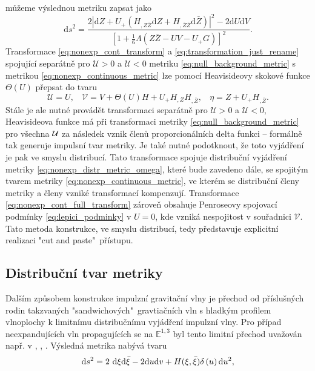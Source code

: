 můžeme výslednou metriku zapsat jako
\begin{equation}
    \label{eq:nonexp_continuous_metric}
    \mathrm{d} s^{2}=\frac{2\left|\mathrm{d} Z+U_+\left(H_{, Z \bar{Z}} 
    \mathrm{d} Z+H_{, \bar{Z} \bar{Z}} \mathrm{d} \bar{Z}\right)\right|^{2}-2 \mathrm{d} U 
    \mathrm{d} V}{\left[1+\frac{1}{6} \Lambda(Z \bar{Z}-U V-U_+ G)\right]^{2}}.
\end{equation}
Transformace \eqref{eq:nonexp_cont_transform} a \eqref{eq:transformation_just_rename} spojující separátně pro $\mathcal{U}>0$ a $\mathcal{U}<0$ metriku \eqref{eq:null_background_metric}
s metrikou \eqref{eq:nonexp_continuous_metric} lze pomocí Heavisideovy skokové funkce $\Theta(U)$ přepsat do tvaru 
\begin{equation}
    \label{eq:nonexp_cont_full_transform}
    \mathcal{U}=U,~~~~ \mathcal{V}=V+\Theta(U) H + U_+ H_{,Z}H_{,\bar{Z}},~~~~ \eta=Z+ U_+ H_{,\bar{Z}}.
\end{equation}
Stále je ale nutné provádět transformaci separátně pro $\mathcal{U}>0$ a $\mathcal{U}<0$, Heavisideova funkce
má při transformaci metriky \eqref{eq:null_background_metric} pro všechna $\mathcal{U}$ za následek vznik členů proporcionálních delta funkci -- formálně tak generuje impulsní tvar metriky. Je také nutné podotknout,
že toto vyjádření je pak ve smyslu distribucí.
Tato transformace spojuje distribuční vyjádření metriky \eqref{eq:nonexp_distr_metric_omega}, které bude zavedeno dále,
se spojitým tvarem metriky \eqref{eq:nonexp_continuous_metric}, ve kterém se distribuční členy metriky a členy vzniké transformací kompenzují.
Transformace \eqref{eq:nonexp_cont_full_transform} zároveň obsahuje Penroseovy spojovací podmínky \eqref{eq:lepici_podminky} v $U=0$, kde
vzniká nespojitost v souřadnici $\mathcal{V}$. Tato metoda konstrukce, ve smyslu distribucí, tedy představuje explicitní realizaci "cut and paste"\ přístupu.


\subsection{Distribuční tvar metriky}
Dalším způsobem konstrukce impulzní gravitační vlny je přechod od příslušných rodin takzvaných "sandwichových"\
gravtiačních vln s hladkým profilem vlnoplochy k limitnímu distribučnímu vyjádření impulzní vlny. Pro případ neexpandujících vln propagujících se
na $\mathbb{E}^{1,3}$ byl tento limitní přechod uvažován např. v \cite{Penrose1968TwistorQuant}, \cite{Podolsky_1998}, \cite{Podolsky_1998_nonexpanding}.
Výsledná metrika nabývá tvaru
\begin{equation}
    \mathrm{d} s^2 = 2~ \mathrm{d} \xi \mathrm{d} \bar{\xi} - 2 \mathrm{d} u \mathrm{d} v + H(\xi, \bar{\xi}) \delta\left( u\right) \mathrm{d} u^2,
\end{equation}

